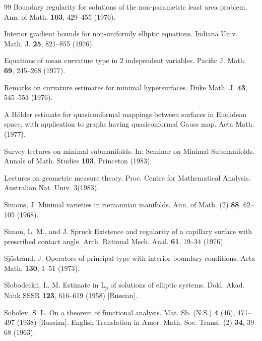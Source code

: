 \begin{thebibliography}{99}
Boundary regularity for solutions of the non-parametric least area problem. Ann. of Math. \textbf{103}, 429--455 (1976).

Interior gradient bounds for non-uniformly elliptic equations. Indiana Univ. Math. J. \textbf{25}, 821--855 (1976).

Equations of mean curvature type in 2 independent variables. Pacific J. Math. \textbf{69}, 245--268 (1977).

Remarks on curvature estimates for minimal hypersurfaces. Duke Math. J. \textbf{43}, 545--553 (1976).

A Hölder estimate for quasiconformal mappings between surfaces in Euclidean space, with application to graphs having quasiconformal Gauss map. Acta Math. (1977).

Survey lectures on minimal submanifolds. In: Seminar on Minimal Submanifolds. Annals of Math. Studies \textbf{103}, Princeton (1983).

Lectures on geometric measure theory. Proc. Centre for Mathematical Analysis. Australian Nat. Univ. 3(1983).

Simons, J.
Minimal varieties in riemannian manifolds. Ann. of Math. (2) \textbf{88}, 62--105 (1968).

Simon, L. M., and J. Spruck
Existence and regularity of a capillary surface with prescribed contact angle. Arch. Rational Mech. Anal. \textbf{61}, 19--34 (1976).

Sjöstrand, J.
Operators of principal type with interior boundary conditions. Acta Math. \textbf{130}, 1--51 (1973).

Slobodeckii, L. M.
Estimate in L$_p$ of solutions of elliptic systems. Dokl. Akad. Nauk SSSR \textbf{123}, 616--619 (1958)
{}[Russian].

Sobolev, S. L.
On a theorem of functional analysis. Mat. Sb. (N.S.) \textbf{4} (46), 471--497 (1938) [Russian].
English Translation in Amer. Math. Soc. Transl. (2) \textbf{34}, 39--68 (1963).

\end{thebibliography}


